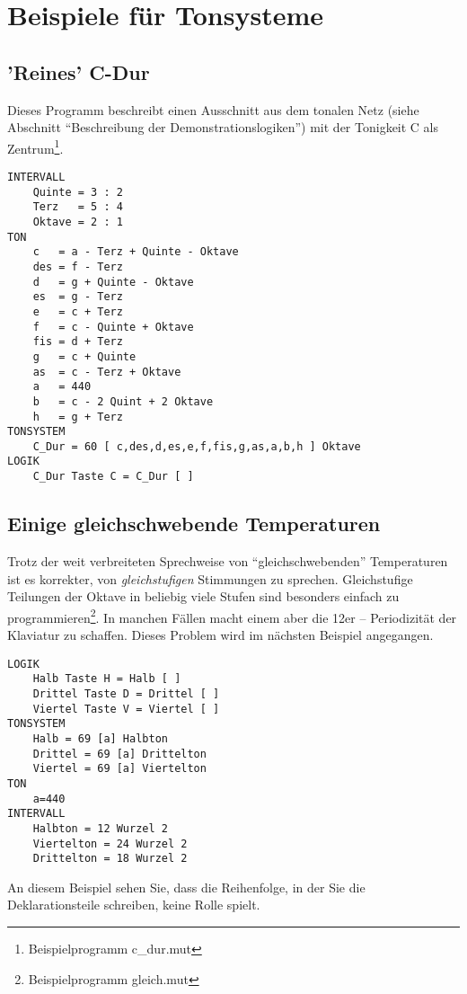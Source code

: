 \section{Beispiele für Tonsysteme}\label{sec:beisp-fur-tonsyst}
\subsection{'Reines' C-Dur}\label{sec:reines-c-dur}

Dieses Programm beschreibt einen Ausschnitt aus dem tonalen Netz
(siehe Abschnitt "`Beschreibung der Demonstrationslogiken"') mit der
Tonigkeit C als Zentrum\footnote{Beispielprogramm c\_dur.mut}.

\label{CDUR}
\begin{verbatim}
INTERVALL
    Quinte = 3 : 2
    Terz   = 5 : 4
    Oktave = 2 : 1
TON
    c   = a - Terz + Quinte - Oktave
    des = f - Terz
    d   = g + Quinte - Oktave
    es  = g - Terz
    e   = c + Terz
    f   = c - Quinte + Oktave
    fis = d + Terz
    g   = c + Quinte
    as  = c - Terz + Oktave
    a   = 440
    b   = c - 2 Quint + 2 Oktave
    h   = g + Terz
TONSYSTEM
    C_Dur = 60 [ c,des,d,es,e,f,fis,g,as,a,b,h ] Oktave
LOGIK
    C_Dur Taste C = C_Dur [ ]
\end{verbatim}

\subsection{Einige gleichschwebende Temperaturen}\label{sec:einige-gleichschw-te}
Trotz der weit verbreiteten Sprechweise von "`gleichschwebenden"'
Temperaturen ist es korrekter, von \emph{gleichstufigen} Stimmungen zu
sprechen.  Gleichstufige Teilungen der Oktave in beliebig viele Stufen
sind besonders einfach zu pro\-gram\-mieren\footnote{Beispielprogramm
  gleich.mut}. In manchen Fällen macht einem aber die 12er --
Periodizität der Klaviatur zu schaffen. Dieses Problem wird im
nächsten Beispiel angegangen.
\label{GLEICHSCH}
\begin{verbatim}
LOGIK
    Halb Taste H = Halb [ ]
    Drittel Taste D = Drittel [ ]
    Viertel Taste V = Viertel [ ]
TONSYSTEM
    Halb = 69 [a] Halbton
    Drittel = 69 [a] Drittelton
    Viertel = 69 [a] Viertelton
TON
    a=440
INTERVALL
    Halbton = 12 Wurzel 2
    Viertelton = 24 Wurzel 2
    Drittelton = 18 Wurzel 2
\end{verbatim}
An diesem Beispiel sehen Sie, dass die Reihenfolge, in der Sie die
Deklarationsteile schreiben, keine Rolle spielt.

